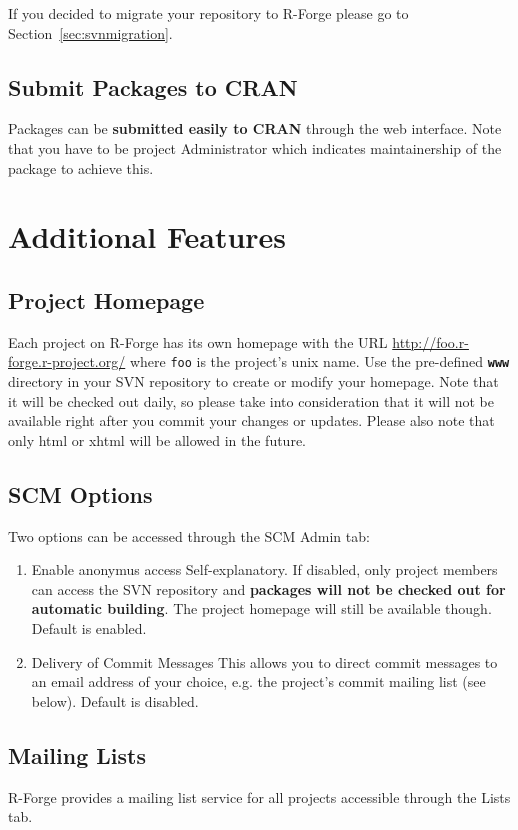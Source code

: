 \documentclass[a4paper]{article}
\begin{document}
If you decided to migrate your repository to R-Forge please go to
Section~\ref{sec:svnmigration}.

\subsection{Submit Packages to CRAN}
Packages can be \textbf{submitted easily to CRAN} through the web interface.
Note that you have to be project Administrator which indicates maintainership
of the package to achieve this. 


\section{Additional Features}

\subsection{Project Homepage}
Each project on R-Forge has its own homepage with the URL
\url{http://foo.r-forge.r-project.org/} where \texttt{foo} is the
project's unix name. Use the
pre-defined \textbf{\texttt{www}} directory in your SVN repository to
create or modify your homepage. Note that it will be checked out
daily, so please take into consideration that it will not be available
right after you commit your changes or updates. Please also note that
only html or xhtml will be allowed in the future.


\subsection{SCM Options}
\label{sec:scmoptions}
Two options can be accessed through the SCM Admin tab:
\begin{enumerate}
\item{Enable anonymus access} Self-explanatory. If disabled, only
  project members can access the SVN repository and  \textbf{packages
    will not be checked out for automatic building}. The project
  homepage will still be available though. Default is enabled.

\item{Delivery of Commit Messages} This allows you to direct commit
  messages to an email address of your choice, e.g. the project's
  commit mailing list (see below). Default is disabled.
\end{enumerate}


\subsection{Mailing Lists}
R-Forge provides a mailing list service for all projects accessible
through the Lists tab.  
\end{document}

